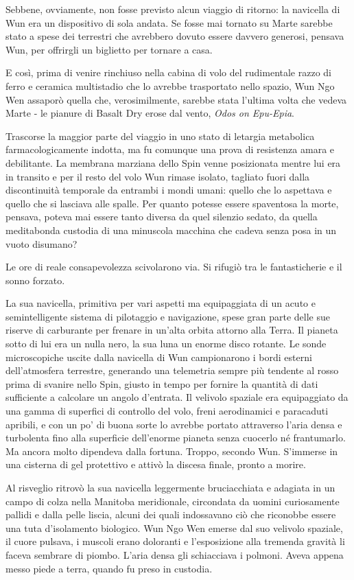 Sebbene, ovviamente, non fosse previsto alcun viaggio di ritorno: la
navicella di Wun era un dispositivo di sola andata. Se fosse mai tornato
su Marte sarebbe stato a spese dei terrestri che avrebbero dovuto essere
davvero generosi, pensava Wun, per offrirgli un biglietto per tornare a
casa.

E così, prima di venire rinchiuso nella cabina di volo del rudimentale
razzo di ferro e ceramica multistadio che lo avrebbe trasportato nello
spazio, Wun Ngo Wen assaporò quella che, verosimilmente, sarebbe stata
l'ultima volta che vedeva Marte - le pianure di Basalt Dry erose dal
vento, \emph{Odos on Epu-Epia}.

Trascorse la maggior parte del viaggio in uno stato di letargia
metabolica farmacologicamente indotta, ma fu comunque una prova di
resistenza amara e debilitante. La membrana marziana dello Spin venne
posizionata mentre lui era in transito e per il resto del volo Wun
rimase isolato, tagliato fuori dalla discontinuità temporale da entrambi
i mondi umani: quello che lo aspettava e quello che si lasciava alle
spalle. Per quanto potesse essere spaventosa la morte, pensava, poteva
mai essere tanto diversa da quel silenzio sedato, da quella meditabonda
custodia di una minuscola macchina che cadeva senza posa in un vuoto
disumano?

Le ore di reale consapevolezza scivolarono via. Si rifugiò tra le
fantasticherie e il sonno forzato.

La sua navicella, primitiva per vari aspetti ma equipaggiata di un acuto
e semintelligente sistema di pilotaggio e navigazione, spese gran parte
delle sue riserve di carburante per frenare in un'alta orbita attorno
alla Terra. Il pianeta sotto di lui era un nulla nero, la sua luna un
enorme disco rotante. Le sonde microscopiche uscite dalla navicella di
Wun campionarono i bordi esterni dell'atmosfera terrestre, generando una
telemetria sempre più tendente al rosso prima di svanire nello Spin,
giusto in tempo per fornire la quantità di dati sufficiente a calcolare
un angolo d'entrata. Il velivolo spaziale era equipaggiato da una gamma
di superfici di controllo del volo, freni aerodinamici e paracaduti
apribili, e con un po' di buona sorte lo avrebbe portato attraverso
l'aria densa e turbolenta fino alla superficie dell'enorme pianeta senza
cuocerlo né frantumarlo. Ma ancora molto dipendeva dalla fortuna.
Troppo, secondo Wun. S'immerse in una cisterna di gel protettivo e
attivò la discesa finale, pronto a morire.

Al risveglio ritrovò la sua navicella leggermente bruciacchiata e
adagiata in un campo di colza nella Manitoba meridionale, circondata da
uomini curiosamente pallidi e dalla pelle liscia, alcuni dei quali
indossavano ciò che riconobbe essere una tuta d'isolamento biologico.
Wun Ngo Wen emerse dal suo velivolo spaziale, il cuore pulsava, i
muscoli erano doloranti e l'esposizione alla tremenda gravità li faceva
sembrare di piombo. L'aria densa gli schiacciava i polmoni. Aveva appena
messo piede a terra, quando fu preso in custodia.

